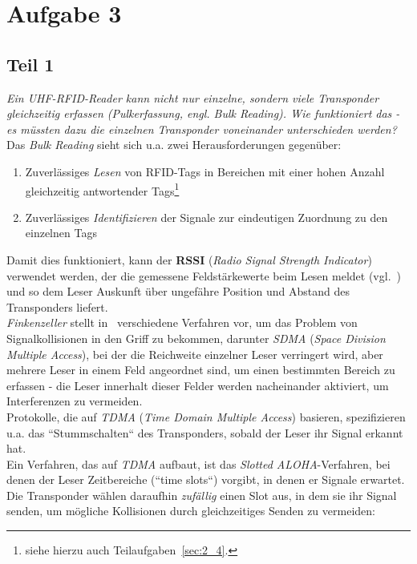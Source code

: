 \chapter{Aufgabe 3}

\section{Teil 1}

\textit{Ein UHF-RFID-Reader kann nicht nur einzelne, sondern viele Transponder gleichzeitig erfassen (Pulkerfassung, engl. Bulk Reading). Wie
funktioniert das - es müssten dazu die einzelnen Transponder voneinander unterschieden werden?}\\

\noindent
Das \textit{Bulk Reading} sieht sich u.a. zwei Herausforderungen gegenüber:

\begin{enumerate}
    \itemsep0.5em
    \item Zuverlässiges \textit{Lesen} von RFID-Tags in Bereichen mit einer hohen Anzahl gleichzeitig antwortender Tags\footnote{
    siehe hierzu auch Teilaufgaben~\ref{sec:2_4}.
    }
    \item Zuverlässiges \textit{Identifizieren} der Signale zur eindeutigen Zuordnung zu den einzelnen Tags
\end{enumerate}

\noindent
Damit dies funktioniert, kann der \textbf{RSSI} (\textit{Radio Signal Strength Indicator}) verwendet werden, der die gemessene Feldstärkewerte beim Lesen meldet (vgl.~\cite[136]{ES5}) und so dem Leser Auskunft über ungefähre Position und Abstand des Transponders liefert.\\
\textit{Finkenzeller} stellt in~\cite[194]{Fin10} verschiedene Verfahren vor, um das Problem von Signalkollisionen in den Griff zu bekommen, darunter \textit{SDMA} (\textit{Space Division Multiple Access}), bei der die Reichweite einzelner Leser verringert wird, aber mehrere Leser in einem Feld angeordnet sind, um einen bestimmten Bereich zu erfassen - die Leser innerhalt dieser Felder werden nacheinander aktiviert, um Interferenzen zu vermeiden.\\
Protokolle, die auf \textit{TDMA} (\textit{Time Domain Multiple Access}) basieren, spezifizieren u.a. das ``Stummschalten`` des Transponders, sobald der Leser ihr Signal erkannt hat.\\
Ein Verfahren, das auf \textit{TDMA} aufbaut, ist das \textit{Slotted ALOHA}-Verfahren, bei denen der Leser Zeitbereiche (``time slots``) vorgibt, in denen er Signale erwartet.
Die Transponder wählen daraufhin \textit{zufällig} einen Slot aus, in dem sie ihr Signal senden, um mögliche Kollisionen durch gleichzeitiges Senden zu vermeiden:


